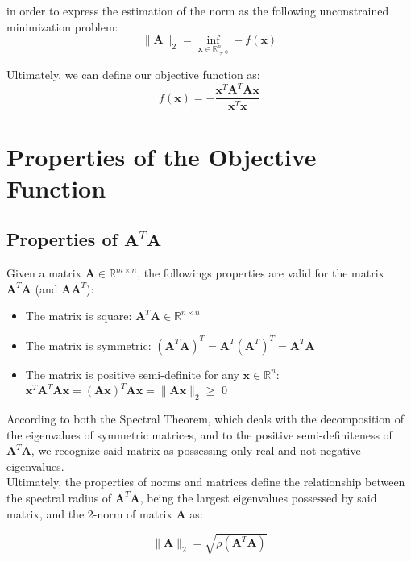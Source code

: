 \documentclass{article}
\numberwithin{equation}{section}
\begin{document}
in order to express the estimation of the norm as the following unconstrained minimization problem:
\begin{equation}
    \|\boldsymbol{A}\|_2=\inf_{\boldsymbol{x} \in \mathbb{R}^n_{\not = 0}}  - f(\boldsymbol{x})
\end{equation}

Ultimately, we can define our objective function as:
\begin{equation}
    f(\boldsymbol{x})= - \frac{\boldsymbol{x}^T \boldsymbol{A}^T \boldsymbol{A} \boldsymbol{x}}{\boldsymbol{x}^T \boldsymbol{x}}
\end{equation}

\section{Properties of the Objective Function}
\subsection{Properties of $\boldsymbol{A}^T\boldsymbol{A}$}
Given a matrix $\boldsymbol{A}\in \mathbb{R}^{m\times n}$, the followings properties are valid for the matrix $\boldsymbol{A}^T\boldsymbol{A}$ (and $\boldsymbol{AA}^T$):
\begin{itemize}
\item The matrix is square: $\boldsymbol{A}^T\boldsymbol{A}\in \mathbb{R}^{n\times n}$
\item The matrix is symmetric: $(\boldsymbol{A}^T\boldsymbol{A})^T=\boldsymbol{A}^T(\boldsymbol{A}^T)^T=\boldsymbol{A}^T\boldsymbol{A}$
\item The matrix is positive semi-definite for any $\boldsymbol{x} \in \mathbb{R}^n$: $\boldsymbol{x}^T\boldsymbol{A}^T\boldsymbol{Ax}=(\boldsymbol{Ax})^T\boldsymbol{Ax}=\|\boldsymbol{Ax}\|_2$$ \geq$ 0

\end{itemize}
According to both the Spectral Theorem, which deals with the decomposition of the eigenvalues of symmetric matrices, and to the positive semi-definiteness of $\boldsymbol{A}^T\boldsymbol{A}$, we recognize said matrix as possessing only real and not negative eigenvalues.
\\
Ultimately, the properties of norms and matrices define the relationship between the spectral radius of $\boldsymbol{A}^T\boldsymbol{A}$, being the largest eigenvalues possessed by said matrix, and the 2-norm of matrix $\boldsymbol{A}$ as: 

\begin{equation}
    \|\boldsymbol{A}\|_2 = \sqrt{\rho(\boldsymbol{A}^T\boldsymbol{A})}
\end{equation} 
\end{document}
